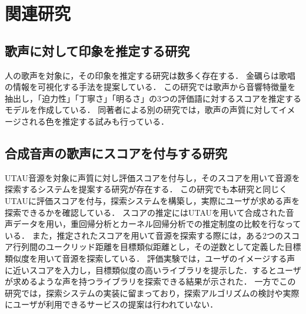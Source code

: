 \thispagestyle{myheadings}
\chapter{関連研究}
\label{sec:format}

\section{歌声に対して印象を推定する研究}
人の歌声を対象に，その印象を推定する研究は数多く存在する．
金礪らは歌唱の情報を可視化する手法を提案している\cite{impression}．
この研究では歌声から音響特徴量を抽出し，「迫力性」「丁寧さ」「明るさ」の3つの評価語に対するスコアを推定するモデルを作成している．
同著者による別の研究では，歌声の声質に対してイメージされる色を推定する試みも行っている\cite{voice_color}．


\section{合成音声の歌声にスコアを付与する研究}
UTAU音源を対象に声質に対し評価スコアを付与し，そのスコアを用いて音源を探索するシステムを提案する研究\cite{ong}が存在する．
この研究でも本研究と同じくUTAUに評価スコアを付与，探索システムを構築し，実際にユーザが求める声を探索できるかを確認している．
スコアの推定にはUTAUを用いて合成された音声データを用い，重回帰分析とカーネル回帰分析での推定制度の比較を行なっている．
また，推定されたスコアを用いて音源を探索する際には，ある2つのスコア行列間のユークリッド距離を目標類似距離とし，その逆数として定義した目標類似度を用いて音源を探索している．
評価実験では，ユーザのイメージする声に近いスコアを入力し，目標類似度の高いライブラリを提示した．するとユーザが求めるような声を持つライブラリを探索できる結果が示された．
一方でこの研究では，探索システムの実装に留まっており，探索アルゴリズムの検討や実際にユーザが利用できるサービスの提案は行われていない．

